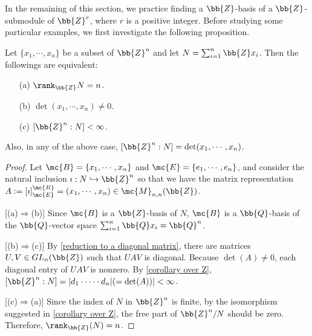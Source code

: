In the remaining of this section, we practice finding a $\bb{Z}$-basis of a $\bb{Z}$-submodule of $\bb{Z}^r$, where $r$ is a positive integer.
Before studying some particular examples, we first investigate the following proposition.
\begin{prop}
    Let $\{x_1, \cdots, x_n\}$ be a subset of $\bb{Z}^n$ and let $N=\sum_{i=1}^n \bb{Z}x_i$.
    Then the followings are equivalent:
    \begin{enumerate}
        \item[(a)]
        {
            $\rank_\bb{Z} N=n$.
        }
        \item[(b)]
        {
            $\det(x_1, \cdots, x_n)\neq 0$.
        }
        \item[(c)]
        {
            $[\bb{Z}^n: N]<\infty$.
        }
    \end{enumerate}
    Also, in any of the above case, $[\bb{Z}^n: N]=\det(x_1, \cdots, x_n)$.
\end{prop}
\begin{proof}
    Let $\mc{B}=\{x_1, \cdots, x_n\}$ and $\mc{E}=\{e_1, \cdots, e_n\}$, and consider the natural inclusion $\imath: N\hookrightarrow\bb{Z}^n$ so that we have the matrix representation $A:=[\imath]^\mc{B}_\mc{E}=(x_1, \cdots, x_n)\in\mc{M}_{n, n}(\bb{Z})$.
    
    [(a)$\Rightarrow$(b)]
    Since $\mc{B}$ is a $\bb{Z}$-basis of $N$, $\mc{B}$ is a $\bb{Q}$-basis of the $\bb{Q}$-vector space $\sum_{i=1}^n\bb{Q}x_i=\bb{Q}^n$.

    [(b)$\Rightarrow$(c)]
    By \cref{reduction to a diagonal matrix}, there are matrices $U, V\in GL_n(\bb{Z})$ such that $UAV$ is diagonal.
    Because $\det(A)\neq 0$, each diagonal entry of $UAV$ is nonzero.
    By \cref{corollary over Z}, $[\bb{Z}^n: N]=|d_1\cdot\cdots\cdot d_n|(=\det(A))|<\infty$.

    [(c)$\Rightarrow$(a)]
    Since the index of $N$ in $\bb{Z}^n$ is finite, by the isomorphism suggested in \cref{corollary over Z}, the free part of $\bb{Z}^n/N$ should be zero.
    Therefore, $\rank_\bb{Z}(N)=n$.
\end{proof}

